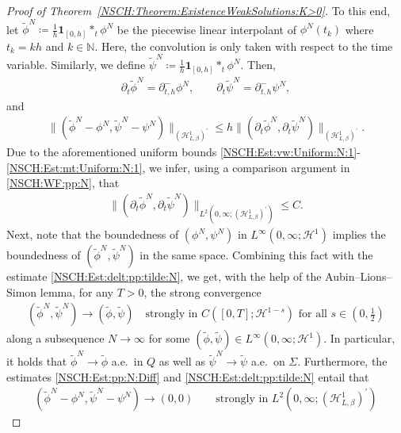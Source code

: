 \documentclass[11pt,reqno]{amsart}
\theoremstyle{remark}
\numberwithin{equation}{section}
\newcommand{\norm}[1]{\| #1 \|}
\newcommand{\N}{\mathbb N}
\newcommand{\del}{\partial}
\newcommand{\delt}{\partial_{t}}
\newcommand{\delthm}{\del_{t,h}^-}
\begin{document}
\begin{proof}[Proof of Theorem~\ref{NSCH:Theorem:ExistenceWeakSolutions:K>0}]
    To this end, let $\widetilde{\phi}^N \coloneqq \tfrac1h\mathbf{1}_{[0,h]}\ast_t\phi^N$ be the piecewise linear interpolant of $\phi^N(t_k)$ where $t_k = kh$ and $k\in\N$. Here, the convolution is only taken with respect to the time variable. Similarly, we define $\widetilde{\psi}^N \coloneqq \tfrac1h\mathbf{1}_{[0,h]}\ast_t\phi^N$. Then,
    \begin{align*}
        \delt\widetilde{\phi}^N = \delthm\phi^N, \qquad \delt\tilde{\psi}^N = \delthm\psi^N,
    \end{align*}
    and
    \begin{align}\label{NSCH:Est:pp:N:Diff}
        \norm{(\widetilde{\phi}^N - \phi^N, \widetilde{\psi}^N - \psi^N)}_{(\mathcal{H}^1_{L,\beta})^\prime} \leq h\norm{(\delt\widetilde{\phi}^N, \delt\widetilde{\psi}^N)}_{(\mathcal{H}^1_{L,\beta})^\prime}.
    \end{align}
    Due to the aforementioned uniform bounds \eqref{NSCH:Est:vw:Uniform:N:1}-\eqref{NSCH:Est:mt:Uniform:N:1}, we infer, using a comparison argument in \eqref{NSCH:WF:pp:N}, that
    \begin{align}\label{NSCH:Est:delt:pp:tilde:N}
        \norm{(\delt\widetilde{\phi}^N,\delt\widetilde{\psi}^N)}_{L^2(0,\infty;(\mathcal{H}^1_{L,\beta})^\prime)} \leq C.
    \end{align}
    Next, note that the boundedness of $(\phi^N,\psi^N)$ in $L^\infty(0,\infty;\mathcal{H}^1)$ implies the boundedness of $(\widetilde{\phi}^N,\widetilde{\psi}^N)$ in the same space. Combining this fact with the estimate \eqref{NSCH:Est:delt:pp:tilde:N}, we get, with the help of the Aubin--Lions--Simon lemma, for any $T > 0$, the strong convergence
    \begin{align}\label{NSCH:Conv:pp:Strongly}
        (\widetilde \phi^N, \widetilde \psi^N) \rightarrow (\widetilde \phi, \widetilde \psi) \quad\text{strongly in~} C([0,T];\mathcal{H}^{1-s}) \text{~for all~}s\in(0,\tfrac12)
    \end{align}
    along a subsequence $N\rightarrow\infty$ for some $(\widetilde \phi, \widetilde \psi)\in L^\infty(0,\infty;\mathcal{H}^1)$. In particular, it holds that $\widetilde \phi^N\rightarrow\widetilde \phi$ a.e.~in $Q$ as well as $\widetilde \psi^N\rightarrow\widetilde \psi$ a.e.~on $\Sigma$. Furthermore, the estimates \eqref{NSCH:Est:pp:N:Diff} and \eqref{NSCH:Est:delt:pp:tilde:N} entail that
    \begin{align*}
        (\widetilde \phi^N - \phi^N, \widetilde \psi^N - \psi^N) \rightarrow (0,0) \qquad\text{strongly in~} L^2(0,\infty;(\mathcal{H}^1_{L,\beta})^\prime)

\end{align*}
\end{proof}
\end{document}
